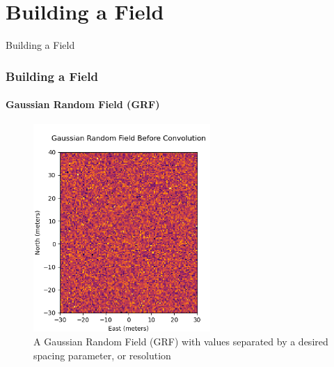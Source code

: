 \documentclass[professionalfont,10pt]{beamer}
\begin{document}
	\section{Building a Field}
	\begin{frame}[t]{Building a Field}
		\frametitle{Building a Field}
		\framesubtitle{Gaussian Random Field (GRF)}
		\hskip-0.75cm
		\begin{minipage}[t]{0.2\linewidth}\vspace{-0.5cm}
			\tiny\tableofcontents[currentsection,currentsubsection,hideothersubsections,subsectionstyle=show/shaded]
		\end{minipage}
		\hfill%
		\begin{minipage}[t]{0.86\linewidth}\vspace{-0.5cm}
			\begin{figure}[t]
				\centering
				\captionsetup{width=0.9\textwidth}
				\includegraphics[width=0.6\textwidth]{../images/GRFbeforeConv.png}
				\caption{A Gaussian Random Field (GRF) with values separated by a desired spacing parameter, or resolution}
			\end{figure}
		\end{minipage}
		\vfill%
	\end{frame}
\end{document}
